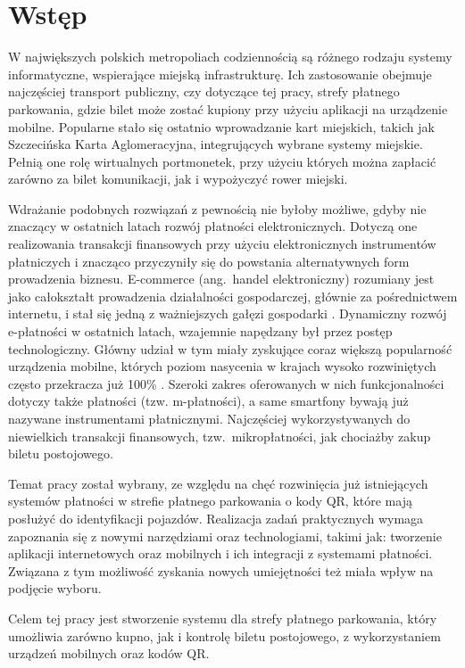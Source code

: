 \section*{Wstęp}

W największych polskich metropoliach codziennością są różnego rodzaju systemy informatyczne, wspierające miejską infrastrukturę. Ich zastosowanie obejmuje najczęściej transport publiczny, czy dotyczące tej pracy, strefy płatnego parkowania, gdzie bilet może zostać kupiony przy użyciu aplikacji na urządzenie mobilne. Popularne stało się ostatnio wprowadzanie kart miejskich, takich jak Szczecińska Karta Aglomeracyjna, integrujących wybrane systemy miejskie. Pełnią one rolę wirtualnych portmonetek, przy użyciu których można zapłacić zarówno za bilet komunikacji, jak i wypożyczyć rower miejski. 

Wdrażanie podobnych rozwiązań z pewnością nie byłoby możliwe, gdyby nie znaczący w ostatnich latach rozwój płatności elektronicznych. Dotyczą one realizowania transakcji finansowych przy użyciu elektronicznych instrumentów płatniczych i znacząco przyczyniły się do powstania alternatywnych form prowadzenia biznesu. E-commerce (ang.~handel elektroniczny) rozumiany jest jako całokształt prowadzenia działalności gospodarczej, głównie za pośrednictwem internetu, i stał się jedną z ważniejszych gałęzi gospodarki \cite{barometr_radio}. Dynamiczny rozwój e-płatności w ostatnich latach, wzajemnie napędzany był przez postęp technologiczny. Główny udział w tym miały zyskujące coraz większą popularność urządzenia mobilne, których poziom nasycenia w krajach wysoko rozwiniętych często przekracza już 100\% \cite{biblia_ebiznesu}. Szeroki zakres oferowanych w nich funkcjonalności dotyczy także płatności (tzw. m-płatności), a same smartfony bywają już nazywane instrumentami płatnicznymi. Najczęściej wykorzystywanych do niewielkich transakcji finansowych, tzw.~mikropłatności, jak chociażby zakup biletu postojowego.

Temat pracy został wybrany, ze względu na chęć rozwinięcia już istniejących systemów płatności w strefie płatnego parkowania o kody QR, które mają posłużyć do identyfikacji pojazdów. Realizacja zadań praktycznych wymaga zapoznania się z nowymi narzędziami oraz technologiami, takimi jak: tworzenie aplikacji internetowych oraz mobilnych i ich integracji z systemami płatności. Związana z tym możliwość zyskania nowych umiejętności też miała wpływ na podjęcie wyboru.

Celem tej pracy jest stworzenie systemu dla strefy płatnego parkowania, który  umożliwia zarówno kupno, jak i kontrolę biletu postojowego, z wykorzystaniem urządzeń mobilnych oraz kodów QR.

